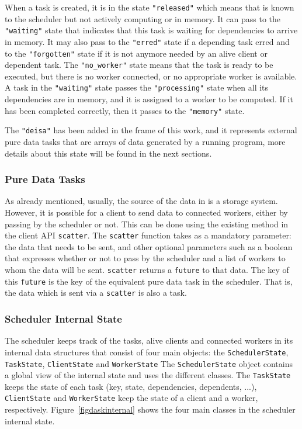 When a task is created, it is in the state \texttt{"released"} which means that is known to the scheduler but not actively computing or in memory. It can pass to the \texttt{"waiting"} state that indicates that this task is waiting for dependencies to arrive in memory. It may also pass to the \texttt{"erred"} state if a depending task erred and to the \texttt{"forgotten"} state if it is not anymore needed by an alive client or dependent task. The \texttt{"no\_worker"} state means that the task is ready to be executed, but there is no worker connected, or no appropriate worker is available. 
A task in the \texttt{"waiting"} state passes the \texttt{"processing"} state when all its dependencies are in memory, and it is assigned to a worker to be computed. If it has been completed correctly, then it passes to the \texttt{"memory"} state. 

The \texttt{"deisa"} has been added in the frame of this work, and it represents external pure data tasks that are arrays of data generated by a running program, more details about this state will be found in the next sections. 

\subsubsection{Pure Data Tasks}\label{sec:puredata}
As already mentioned, usually, the source of the data in \dask is a storage system. However, it is possible for a client to send data to connected workers, either by passing by the scheduler or not. This can be done using the existing method in the client API \texttt{scatter}. The \texttt{scatter} function takes as a mandatory parameter: the data that needs to be sent, and other optional parameters such as a boolean that expresses whether or not to pass by the scheduler and a list of workers to whom the data will be sent. 
\texttt{scatter} returns a \texttt{future} to that data. The key of this \texttt{future} is the key of the equivalent pure data task in the \dask scheduler. That is, the data which is sent via a \texttt{scatter} is also a task.


\subsubsection{Scheduler Internal State}\label{sec:scheduler}

The scheduler keeps track of the tasks, alive clients and connected workers in its internal data structures that consist of four main objects: the \texttt{SchedulerState}, \texttt{TaskState}, \texttt{ClientState} and \texttt{WorkerState}
The \texttt{SchedulerState} object contains a global view of the internal state and uses the different classes. The \texttt{TaskState} keeps the state of each task (key, state, dependencies, dependents, ...), \texttt{ClientState} and \texttt{WorkerState} keep the state of a client and a worker, respectively.
Figure~\ref{figdaskinternal} shows the four main classes in the \dask scheduler internal state. 

